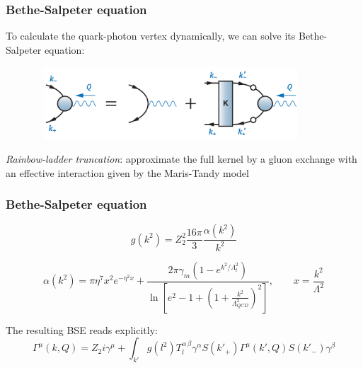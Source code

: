 \begin{frame}\frametitle{Bethe-Salpeter equation}
To calculate the quark-photon vertex dynamically, we can solve its Bethe-Salpeter equation:
\begin{figure}[h]
	\centering
	\includegraphics[height=2.7cm, width=10.2cm]{BSE.png}
\end{figure}
\textit{Rainbow-ladder truncation}: approximate the full kernel by
a gluon exchange with an effective interaction given by the Maris-Tandy model


\end{frame}

\begin{frame}\frametitle{Bethe-Salpeter equation}

\begin{equation}
	g(k^2)=Z^2_2\frac{16\pi}{3}\frac{\alpha(k^2)}{k^2}
\end{equation}

\begin{equation}
\alpha(k^2)=\pi \eta^7 x^2 e^{-\eta^2 x} + \frac{2\pi\gamma_m\left(1-e^{k^2/\Lambda_t^2}\right)}{\ln\left[e^2 - 1 + \left(1 + \frac{k^2}{\Lambda_{QCD}^2}\right)^2\right]}, \qquad x=\frac{k^2}{\Lambda^2}
\end{equation}

The resulting BSE reads explicitly:
\begin{equation}
	\Gamma^\mu(k, Q)=Z_2i\gamma^\mu+\int_{k'}\!\!g(l^2)T^{\alpha\,\beta}_l\gamma^\alpha S(k'_+)\Gamma^\mu(k', Q)S(k'_-)\gamma^\beta
\end{equation}
\end{frame}

\endinput
